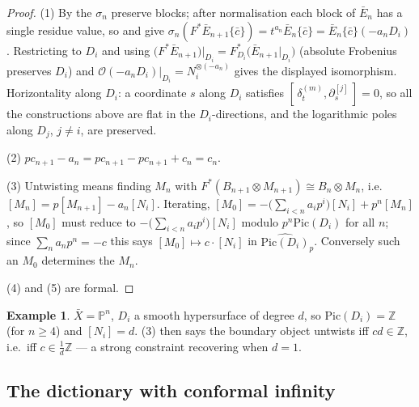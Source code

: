 \documentclass[11pt,reqno]{amsart}
\newcommand{\ZZ}{\mathbb{Z}}
\newcommand{\PP}{\mathbb{P}}
\newcommand{\cO}{\mathcal{O}}
\newcommand{\Pic}{\mathrm{Pic}}
\theoremstyle{plain}
\theoremstyle{definition}
\newtheorem{example}[theorem]{Example}
\theoremstyle{remark}
\numberwithin{equation}{section}
\begin{document}
\begin{proof}
(1) By  the $\sigma_n$ preserve blocks; after
normalisation each block of $\bar E_n$ has a single residue value, so
 and  give
$\sigma_n(F^*\bar E_{n+1}\{\bar c\})=t^{a_n}\bar E_n\{\bar c\}
=\bar E_n\{\bar c\}(-a_nD_i)$.  Restricting to $D_i$ and using
$\bigl(F^*\bar E_{n+1}\bigr)\big|_{D_i}=F_{D_i}^*\bigl(\bar E_{n+1}|_{D_i}\bigr)$
(absolute Frobenius preserves $D_i$) and
$\cO(-a_nD_i)|_{D_i}=N_i^{\otimes(-a_n)}$ gives the displayed isomorphism.
Horizontality along $D_i$: a coordinate $s$ along $D_i$ satisfies
$[\,\delta^{(m)}_t,\partial_s^{[j]}\,]=0$, so all the constructions above
are flat in the $D_i$-directions, and the logarithmic poles along
$D_j$, $j\ne i$, are preserved.

(2) $pc_{n+1}-a_n=pc_{n+1}-pc_{n+1}+c_n=c_n$.

(3) Untwisting means finding $M_n$ with $F^*(B_{n+1}\otimes M_{n+1})\cong
B_n\otimes M_n$, i.e.\ $[M_n]=p[M_{n+1}]-a_n[N_i]$.  Iterating,
$[M_0]=-\bigl(\sum_{i<n}a_ip^i\bigr)[N_i]+p^n[M_n]$, so $[M_0]$ must
reduce to $-\bigl(\sum_{i<n}a_ip^i\bigr)[N_i]$ modulo $p^n\Pic(D_i)$ for
all $n$; since $\sum_na_np^n=-c$ this says $[M_0]\mapsto c\cdot[N_i]$ in
$\widehat{\Pic(D_i)}_p$.  Conversely such an $M_0$ determines the $M_n$.

(4) and (5) are formal.
\end{proof}

\begin{example}
$\bar X=\PP^n$, $D_i$ a smooth hypersurface of degree $d$, so
$\Pic(D_i)=\ZZ$ (for $n\ge4$) and $[N_i]=d$.  (3) then
says the boundary object untwists iff $cd\in\ZZ$, i.e.\ iff
$c\in\frac1d\ZZ$ --- a strong constraint recovering 
when $d=1$.
\end{example}

\subsection{The dictionary with conformal infinity}\label{sec:conformal}
\end{document}
